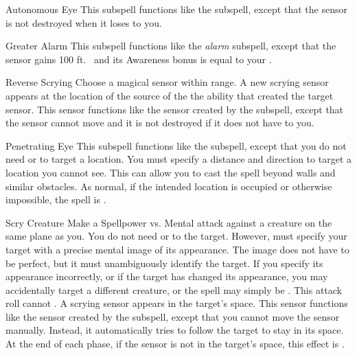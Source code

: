 \begin{ability}[\nth{3}]{Autonomous Eye}
This subspell functions like the  subspell, except that the sensor is not destroyed when it loses  to you.
\end{ability}
\vspace{0.25em}


\begin{ability}[\nth{3}]{Greater Alarm}
This subspell functions like the \textit{alarm} subspell, except that the sensor gains 100 ft.\  and its Awareness bonus is equal to your .
\end{ability}
\vspace{0.25em}


\begin{ability}[\nth{4}]{Reverse Scrying}
Choose a magical sensor within \rngmed range.
A new scrying sensor appears at the location of the source of the the ability that created the target sensor.
This sensor functions like the sensor created by the  subspell, except that the sensor cannot move and it is not destroyed if it does not have  to you.
\end{ability}
\vspace{0.25em}


\begin{ability}[\nth{5}]{Penetrating Eye}
This subspell functions like the  subspell, except that you do not need  or  to target a location.
You must specify a distance and direction to target a location you cannot see.
This can allow you to cast the spell beyond walls and similar obstacles.
As normal, if the intended location is occupied or otherwise impossible, the spell is .
\end{ability}
\vspace{0.25em}


\begin{ability}[\nth{5}]{Scry Creature}
Make a Spellpower vs. Mental attack against a creature on the same plane as you.
You do not need  or  to the target.
However,  must specify your target with a precise mental image of its appearance.
The image does not have to be perfect, but it must unambiguously identify the target.
If you specify its appearance incorrectly, or if the target has changed its appearance, you may accidentally target a different creature, or the spell may simply be .
This attack roll cannot .
\hit A scrying sensor appears in the target's space.
This sensor functions like the sensor created by the  subspell, except that you cannot move the sensor manually.
Instead, it automatically tries to follow the target to stay in its space.
At the end of each phase, if the sensor is not in the target's space, this effect is .
\end{ability}
\vspace{0.25em}


